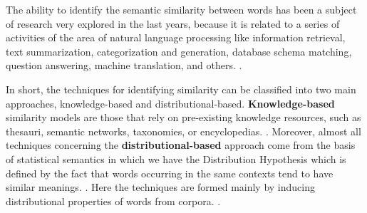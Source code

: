 
The ability to identify the semantic similarity between words has been a subject of research very explored in the last years, because it is related to a series of activities of the area of natural language processing like information retrieval, text summarization, categorization and generation, database schema matching, question answering, machine translation, and others. \cite{Islam2007ApplicationsOC, Jurafsky:2009:SLP:1214993}. 

In short, the techniques for identifying similarity can be classified into two main approaches, knowledge-based and distributional-based. \textbf{Knowledge-based} similarity models are those that rely on pre-existing knowledge resources, such as thesauri, semantic networks, taxonomies, or encyclopedias. \cite{Agirre2009}. Moreover, almost all techniques concerning the \textbf{distributional-based} approach come from the basis of statistical semantics in which we have the Distribution Hypothesis which is defined by the fact that words occurring in the same contexts tend to have similar meanings. \cite{Harris1954}. Here the techniques are formed mainly by inducing distributional properties of words from corpora. \cite{Agirre2009}.


